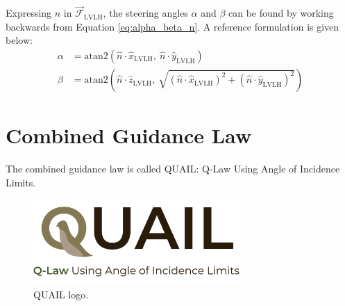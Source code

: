 Expressing $\hat{n}$ in $\vec{\mathcal{F}}_{\text{LVLH}}$, the steering angles $\alpha$ and $\beta$ can be found by working backwards from Equation \ref{eq:alpha_beta_n}. A reference formulation is given below:
\begin{align*}
    \alpha & = \mathrm{atan2}\left(\hat{n} \cdot \hat{x}_{\text{LVLH}}, \ \hat{n} \cdot \hat{y}_{\text{LVLH}}\right)                                                      \\
    \beta  & = \mathrm{atan2}\left(\hat{n} \cdot \hat{z}_{\text{LVLH}}, \ \sqrt{(\hat{n} \cdot \hat{x}_{\text{LVLH}})^2 + (\hat{n} \cdot \hat{y}_{\text{LVLH}})^2}\right)
\end{align*}

\section{Combined Guidance Law}
The combined guidance law is called QUAIL: Q-Law Using Angle of Incidence Limits.

\begin{figure}[H]
    \centering
    \includegraphics[width=0.7\textwidth]{figures/quail_logo_v2.pdf}
    \caption{QUAIL logo.}
    \label{fig:quail_logo}
\end{figure}



